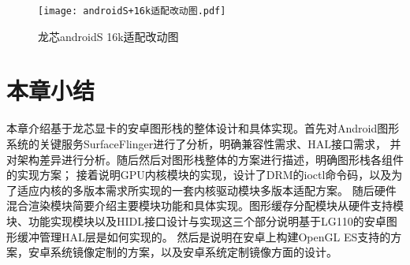 \begin{figure}
  \centering
  \texttt{[image: androidS+16k适配改动图.pdf]}
  \caption{龙芯androidS 16k适配改动图}
  \label{fig:androidS 16k适配改动图}
\end{figure}

\section{本章小结}
本章介绍基于龙芯显卡的安卓图形栈的整体设计和具体实现。首先对Android图形系统的关键服务SurfaceFlinger进行了分析，明确兼容性需求、HAL接口需求，
并对架构差异进行分析。随后然后对图形栈整体的方案进行描述，明确图形栈各组件的实现方案；
接着说明GPU内核模块的实现，设计了DRM的ioctl命令码，以及为了适应内核的多版本需求所实现的一套内核驱动模块多版本适配方案。
随后硬件混合渲染模块简要介绍主要模块功能和具体实现。图形缓存分配模块从硬件支持模块、功能实现模块以及HIDL接口设计与实现这三个部分说明基于LG110的安卓图形缓冲管理HAL层是如何实现的。
然后是说明在安卓上构建OpenGL ES支持的方案，安卓系统镜像定制的方案，以及安卓系统定制镜像方面的设计。






